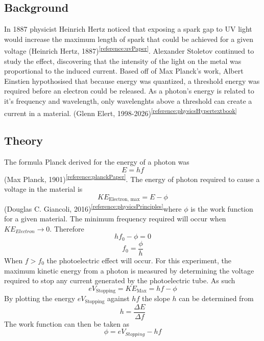 \documentclass{article}[12pt]
\newcommand{\reference}[3]{(#2, #3)\textsuperscript{\ref{#1}}} %
\begin{document}
        \subsection{Background}
            In 1887 physicist Heinrich Hertz noticed that exposing a spark gap to UV light would increase the maximum length of spark that could be achieved for a given voltage \reference{reference:uvPaper}{Heinrich Hertz}{1887}. Alexander Stoletov continued to study the effect, discovering that the intensity of the light on the metal was proportional to the induced current. Based off of Max Planck's work, Albert Einstien hypothosised that because energy was quantized, a threshold energy was required before an electron could be released. As a photon's energy is related to it's frequency and wavelength, only wavelenghts above a threshold can create a current in a material. \reference{reference:physicsHypertextbook}{Glenn Elert}{1998-2026}

        \subsection{Theory}
            The formula Planck derived for the energy of a photon was
                \begin{equation}
                    E = hf
                \end{equation}
            \reference{reference:planckPaper}{Max Planck}{1901}. The energy of photon required to cause a voltage in the material is 
                \begin{equation}
                    KE_{\text{Electron, max}} = E - \phi
                \end{equation}
            \reference{reference:physicsPrinciples}{Douglas C. Giancoli}{2016}where $\phi$ is the work function for a given material. The minimum frequency required will occur when $KE_{Electron} \to 0$. Therefore
                \[hf_0 - \phi = 0\]
                \begin{equation}\label{minfrequency}
                    f_0 = \frac {\phi} h
                \end{equation}
            When $f > f_0$ the photoelectric effect will occur. 
            For this experiment, the maximum kinetic energy from a photon is measured by determining the voltage required to stop any current generated by the photoelectric tube. As such
                \[eV_{\text{Stopping}} = KE_{\text{Max}} = hf - \phi\]
            By plotting the energy $eV_{\text{Stopping}}$ against $hf$ the slope $h$ can be determined from
                \begin{equation}\label{hFromSlope}
                    h = \frac {\Delta E}{\Delta f}
                \end{equation}
            The work function can then be taken as 
                \begin{equation}\label{workFunctionEquation}
                    \phi = eV_{Stopping} - hf
                \end{equation}
\end{document}

